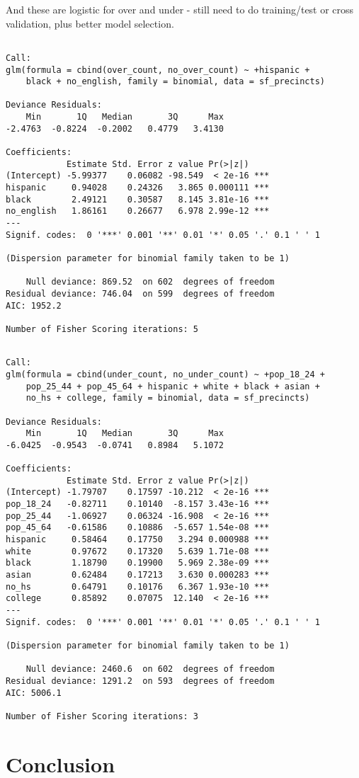 \documentclass[12pt,twoside]{reedthesis}
\theoremstyle{definition}
\theoremstyle{definition}
\theoremstyle{definition}
\theoremstyle{remark}
\begin{document}
And these are logistic for over and under - still need to do
training/test or cross validation, plus better model selection.
\begin{verbatim}

Call:
glm(formula = cbind(over_count, no_over_count) ~ +hispanic + 
    black + no_english, family = binomial, data = sf_precincts)

Deviance Residuals: 
    Min       1Q   Median       3Q      Max  
-2.4763  -0.8224  -0.2002   0.4779   3.4130  

Coefficients:
            Estimate Std. Error z value Pr(>|z|)    
(Intercept) -5.99377    0.06082 -98.549  < 2e-16 ***
hispanic     0.94028    0.24326   3.865 0.000111 ***
black        2.49121    0.30587   8.145 3.81e-16 ***
no_english   1.86161    0.26677   6.978 2.99e-12 ***
---
Signif. codes:  0 '***' 0.001 '**' 0.01 '*' 0.05 '.' 0.1 ' ' 1

(Dispersion parameter for binomial family taken to be 1)

    Null deviance: 869.52  on 602  degrees of freedom
Residual deviance: 746.04  on 599  degrees of freedom
AIC: 1952.2

Number of Fisher Scoring iterations: 5
\end{verbatim}
\begin{verbatim}

Call:
glm(formula = cbind(under_count, no_under_count) ~ +pop_18_24 + 
    pop_25_44 + pop_45_64 + hispanic + white + black + asian + 
    no_hs + college, family = binomial, data = sf_precincts)

Deviance Residuals: 
    Min       1Q   Median       3Q      Max  
-6.0425  -0.9543  -0.0741   0.8984   5.1072  

Coefficients:
            Estimate Std. Error z value Pr(>|z|)    
(Intercept) -1.79707    0.17597 -10.212  < 2e-16 ***
pop_18_24   -0.82711    0.10140  -8.157 3.43e-16 ***
pop_25_44   -1.06927    0.06324 -16.908  < 2e-16 ***
pop_45_64   -0.61586    0.10886  -5.657 1.54e-08 ***
hispanic     0.58464    0.17750   3.294 0.000988 ***
white        0.97672    0.17320   5.639 1.71e-08 ***
black        1.18790    0.19900   5.969 2.38e-09 ***
asian        0.62484    0.17213   3.630 0.000283 ***
no_hs        0.64791    0.10176   6.367 1.93e-10 ***
college      0.85892    0.07075  12.140  < 2e-16 ***
---
Signif. codes:  0 '***' 0.001 '**' 0.01 '*' 0.05 '.' 0.1 ' ' 1

(Dispersion parameter for binomial family taken to be 1)

    Null deviance: 2460.6  on 602  degrees of freedom
Residual deviance: 1291.2  on 593  degrees of freedom
AIC: 5006.1

Number of Fisher Scoring iterations: 3
\end{verbatim}
\hypertarget{conclusion}{%
\chapter*{Conclusion}\label{conclusion}}
\end{document}
